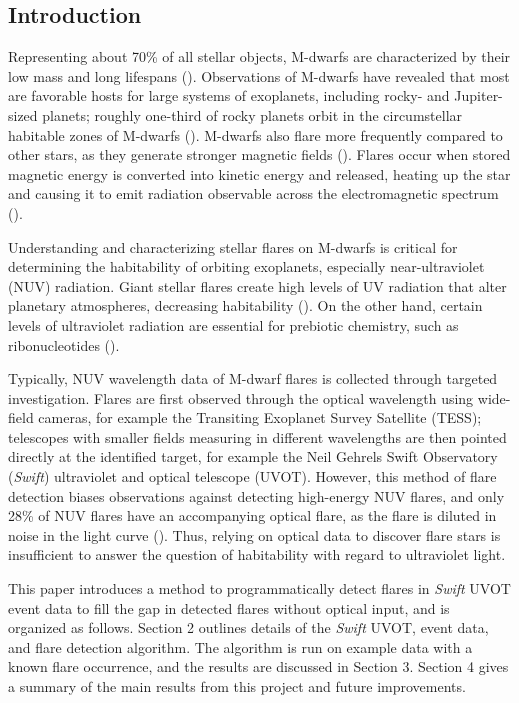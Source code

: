 \documentclass{article}
\begin{document}
\begin{multicols}{2}

\section{Introduction}

Representing about 70\% of all stellar objects, M-dwarfs are characterized by their low mass and long lifespans (\cite{bochanski}). Observations of M-dwarfs have revealed that most are favorable hosts for large systems of exoplanets, including rocky- and Jupiter-sized planets; roughly one-third of rocky planets orbit in the circumstellar habitable zones of M-dwarfs (\cite{aomawa}). M-dwarfs also flare more frequently compared to other stars, as they generate stronger magnetic fields (\cite{shulyak}). Flares occur when stored magnetic energy is converted into kinetic energy and released, heating up the star and causing it to emit radiation observable across the electromagnetic spectrum (\cite{kowalski}). 

Understanding and characterizing stellar flares on M-dwarfs is critical for determining the habitability of orbiting exoplanets, especially near-ultraviolet (NUV) radiation. Giant stellar flares create high levels of UV radiation that alter planetary atmospheres, decreasing habitability (\cite{howard}). On the other hand, certain levels of ultraviolet radiation are essential for prebiotic chemistry, such as ribonucleotides (\cite{ranjan}). 

Typically, NUV wavelength data of M-dwarf flares is collected through targeted investigation. Flares are first observed through the optical wavelength using wide-field cameras, for example the Transiting Exoplanet Survey Satellite (TESS); telescopes with smaller fields measuring in different wavelengths are then pointed directly at the identified target, for example the Neil Gehrels Swift Observatory (\textit{Swift}) ultraviolet and optical telescope (UVOT). However, this method of flare detection biases observations against detecting high-energy NUV flares, and only 28\% of NUV flares have an accompanying optical flare, as the flare is diluted in noise in the light curve (\cite{paudel}). Thus, relying on optical data to discover flare stars is insufficient to answer the question of habitability with regard to ultraviolet light. 

This paper introduces a method to programmatically detect flares in \textit{Swift} UVOT event data to fill the gap in detected flares without optical input, and is organized as follows. Section 2 outlines details of the \textit{Swift} UVOT, event data, and flare detection algorithm. The algorithm is run on example data with a known flare occurrence, and the results are discussed in Section 3. Section 4 gives a summary of the main results from this project and future improvements. 


\end{multicols}
\end{document}
